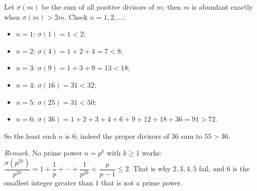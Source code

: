 Let $\sigma(m)$ be the sum of all positive divisors of $m$; then $m$ is abundant exactly when $\sigma(m)>2m$. Check $n=1,2,\dots$:
\begin{itemize}
\item $n=1$: $\sigma(1)=1<2$;
\item $n=2$: $\sigma(4)=1+2+4=7<8$;
\item $n=3$: $\sigma(9)=1+3+9=13<18$;
\item $n=4$: $\sigma(16)=31<32$;
\item $n=5$: $\sigma(25)=31<50$;
\item $n=6$: $\sigma(36)=1+2+3+4+6+9+12+18+36=91>72$.
\end{itemize}
So the least such $n$ is $\boxed{6}$; indeed the proper divisors of $36$ sum to $55>36$.

\emph{Remark.} No prime power $n=p^k$ with $k\ge1$ works: $\dfrac{\sigma\left(p^{2k}\right)}{p^{2k}}=1+\dfrac1p+\cdots+\dfrac{1}{p^{2k}}<\dfrac{p}{p-1}\le2$. That is why $2,3,4,5$ fail, and $6$ is the smallest integer greater than $1$ that is not a prime power.
